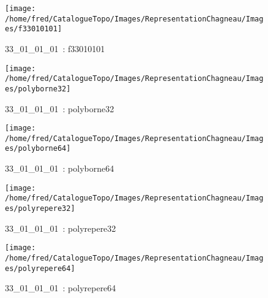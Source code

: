 \documentclass[12pt,titlepage]{book}
\begin{document}
\begin{figure}[h!]
  \hfill         %
  \begin{minipage}[t]{3cm}
    \begin{center}
      \texttt{[image: /home/fred/CatalogueTopo/Images/RepresentationChagneau/Images/f33010101]}
      \caption[~33\_01\_01\_01]{\small{33\_01\_01\_01~:} \tiny{f33010101}}\label{f33010101}
    \end{center}
  \end{minipage}
  \begin{minipage}[t]{3cm}
    \begin{center}
      \texttt{[image: /home/fred/CatalogueTopo/Images/RepresentationChagneau/Images/polyborne32]}
      \caption[~33\_01\_01\_01]{\small{33\_01\_01\_01~:} \tiny{polyborne32}}\label{polyborne32}
    \end{center}
  \end{minipage}
  \begin{minipage}[t]{3cm}
    \begin{center}
      \texttt{[image: /home/fred/CatalogueTopo/Images/RepresentationChagneau/Images/polyborne64]}
      \caption[~33\_01\_01\_01]{\small{33\_01\_01\_01~:} \tiny{polyborne64}}\label{polyborne64}
    \end{center}
  \end{minipage}
  \begin{minipage}[t]{3cm}
    \begin{center}
      \texttt{[image: /home/fred/CatalogueTopo/Images/RepresentationChagneau/Images/polyrepere32]}
      \caption[~33\_01\_01\_01]{\small{33\_01\_01\_01~:} \tiny{polyrepere32}}\label{polyrepere32}
    \end{center}
  \end{minipage}
  \begin{minipage}[t]{3cm}
    \begin{center}
      \texttt{[image: /home/fred/CatalogueTopo/Images/RepresentationChagneau/Images/polyrepere64]}
      \caption[~33\_01\_01\_01]{\small{33\_01\_01\_01~:} \tiny{polyrepere64}}\label{polyrepere64}
    \end{center}
  \end{minipage}
  \begin{minipage}[t]{3cm}

\end{minipage}
\end{figure}
\end{document}
